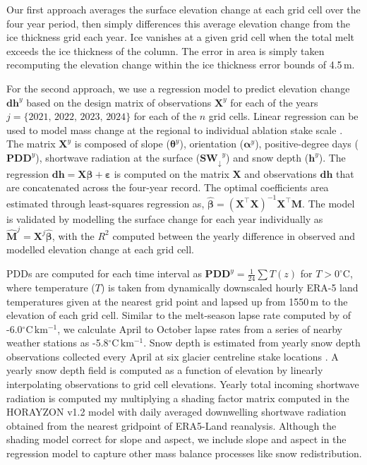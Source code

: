 \documentclass[annals,twocolumn,letterpaper]{igs.cls}
\begin{document}
Our first approach averages the surface elevation change at each grid cell over the four year period, then simply differences this average elevation change from the ice thickness grid each year. Ice vanishes at a given grid cell when the total melt exceeds the ice thickness of the column. The error in area is simply taken recomputing the elevation change within the ice thickness error bounds of 4.5\,m. 

For the second approach, we use a regression model to predict elevation change $\mathbf{dh}^{y}$ based on the design matrix of observations $\mathbf{X}^{y}$ for each of the years $j=\{2021,\,2022,\,2023,\,2024\}$ for each of the $n$ grid cells. Linear regression can be used to model mass change at the regional \citep{Lliboutry1974,Anilkumar2023,Reynaud1986} to individual ablation stake scale \citep{Zekollari2018}. The matrix $\mathbf{X}^{y}$ is composed of slope ($\boldsymbol{\theta}^{y}$), orientation ($\boldsymbol{\alpha}^{y}$), positive-degree days ($\mathbf{PDD}^{y}$), shortwave radiation at the surface ($\mathbf{SW_{\downarrow}}^{y}$) and snow depth ($\mathbf{h}^{y}$). The regression $\mathbf{dh} = \mathbf{X} \boldsymbol{\beta} + \boldsymbol{\varepsilon}$ is computed on the matrix $\mathbf{X}$ and observations $\mathbf{dh}$ that are concatenated across the four-year record. The optimal coefficients area estimated through least-squares regression as, $\hat{\boldsymbol{\beta}} = (\mathbf{X}^\top \mathbf{X})^{-1} \mathbf{X}^\top \mathbf{M}$. The model is validated by modelling the surface change for each year individually as $\hat{\mathbf{M}}^{j} = \mathbf{X}^{j} \hat{\boldsymbol{\beta}}$, with the $R^2$ computed between the yearly difference in observed and modelled elevation change at each grid cell. 

PDDs are computed for each time interval as $\mathbf{PDD}^y = \frac{1}{24}\sum T(z)$ for $T>0^{\circ}$C, where temperature ($T$) is taken from dynamically downscaled hourly ERA-5 land temperatures \citep{Hersbach2020} given at the nearest grid point and lapsed up from 1550\,m to the elevation of each grid cell. Similar to the melt-season lapse rate computed by \cite{Shea2009} of -6.0$\mathrm{^{\circ}C\,km^{-1}}$, we calculate April to October lapse rates from a series of nearby weather stations as -5.8$\mathrm{^{\circ}C\,km^{-1}}$. Snow depth is estimated from yearly snow depth observations collected every April at six glacier centreline stake locations . A yearly snow depth field is computed as a function of elevation by linearly interpolating observations to grid cell elevations. Yearly total incoming shortwave radiation is computed my multiplying a shading factor matrix computed in the HORAYZON v1.2 model \citep{Steger2022} with daily averaged downwelling shortwave radiation obtained from the nearest gridpoint of ERA5-Land reanalysis. Although the shading model correct for slope and aspect, we include slope and aspect in the regression model to capture other mass balance processes like snow redistribution.
\end{document}
